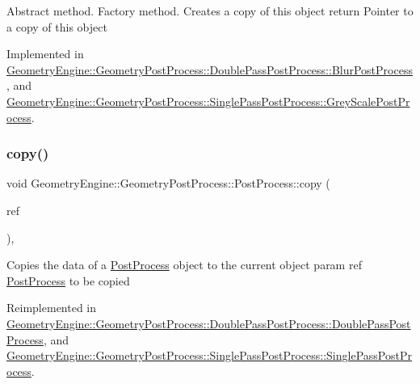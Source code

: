 Abstract method. Factory method. Creates a copy of this object return Pointer to a copy of this object 

Implemented in \mbox{\hyperlink{class_geometry_engine_1_1_geometry_post_process_1_1_double_pass_post_process_1_1_blur_post_process_a4399f435326724c64cf255a40479d330}{Geometry\+Engine\+::\+Geometry\+Post\+Process\+::\+Double\+Pass\+Post\+Process\+::\+Blur\+Post\+Process}}, and \mbox{\hyperlink{class_geometry_engine_1_1_geometry_post_process_1_1_single_pass_post_process_1_1_grey_scale_post_process_a36f198711874587c9cbf5c958e6d09ea}{Geometry\+Engine\+::\+Geometry\+Post\+Process\+::\+Single\+Pass\+Post\+Process\+::\+Grey\+Scale\+Post\+Process}}.

\mbox{\label{class_geometry_engine_1_1_geometry_post_process_1_1_post_process_aba093c175b228894204e785a5a54e6e9}} 
\subsubsection{\texorpdfstring{copy()}{copy()}}
{\footnotesize\ttfamily void Geometry\+Engine\+::\+Geometry\+Post\+Process\+::\+Post\+Process\+::copy (\begin{DoxyParamCaption}\item[{const \mbox{\hyperlink{class_geometry_engine_1_1_geometry_post_process_1_1_post_process}{Post\+Process}} \&}]{ref }\end{DoxyParamCaption})\hspace{0.3cm}{\ttfamily [protected]}, {\ttfamily [virtual]}}

Copies the data of a \mbox{\hyperlink{class_geometry_engine_1_1_geometry_post_process_1_1_post_process}{Post\+Process}} object to the current object param ref \mbox{\hyperlink{class_geometry_engine_1_1_geometry_post_process_1_1_post_process}{Post\+Process}} to be copied 

Reimplemented in \mbox{\hyperlink{class_geometry_engine_1_1_geometry_post_process_1_1_double_pass_post_process_1_1_double_pass_post_process_a28b760437951a4676b55efb491358e8f}{Geometry\+Engine\+::\+Geometry\+Post\+Process\+::\+Double\+Pass\+Post\+Process\+::\+Double\+Pass\+Post\+Process}}, and \mbox{\hyperlink{class_geometry_engine_1_1_geometry_post_process_1_1_single_pass_post_process_1_1_single_pass_post_process_ab47b36f68057dcff05402a9e5a630878}{Geometry\+Engine\+::\+Geometry\+Post\+Process\+::\+Single\+Pass\+Post\+Process\+::\+Single\+Pass\+Post\+Process}}.



